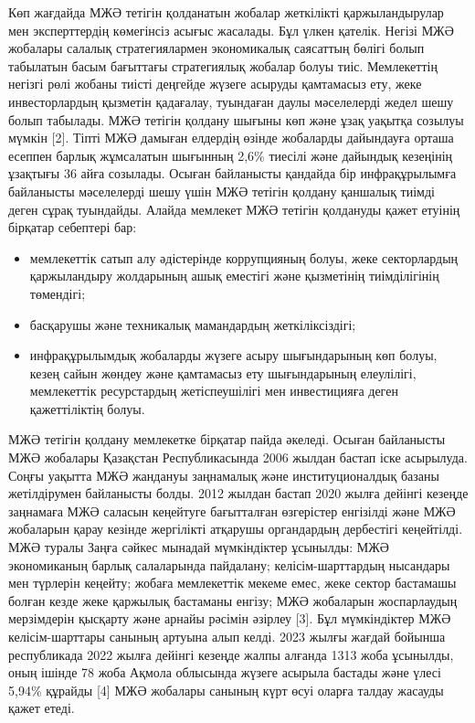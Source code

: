 Көп жағдайда МЖӘ тетігін қолданатын жобалар жеткілікті қаржыландырулар
мен эксперттердің көмегінсіз асығыс жасалады. Бұл үлкен қателік. Негізі
МЖӘ жобалары салалық стратегиялармен экономикалық саясаттың бөлігі болып
табылатын басым бағыттағы стратегиялық жобалар болуы тиіс. Мемлекеттің
негізгі рөлі жобаны тиісті деңгейде жүзеге асыруды қамтамасыз ету, жеке
инвесторлардың қызметін қадағалау, туындаған даулы мәселелерді жедел
шешу болып табылады. МЖӘ тетігін қолдану шығыны көп және ұзақ уақытқа
созылуы мүмкін {[}2{]}. Тіпті МЖӘ дамыған елдердің өзінде жобаларды
дайындауға орташа есеппен барлық жұмсалатын шығынның 2,6\% тиесілі және
дайындық кезеңінің ұзақтығы 36 айға созылады. Осыған байланысты қандайда
бір инфрақұрылымға байланысты мәселелерді шешу үшін МЖӘ тетігін қолдану
қаншалық тиімді деген сұрақ туындайды. Алайда мемлекет МЖӘ тетігін
қолдануды қажет етуінің бірқатар себептері бар:

\begin{itemize}
\item
  мемлекеттік сатып алу әдістерінде коррупцияның болуы, жеке
  секторлардың қаржыландыру жолдарының ашық еместігі және қызметінің
  тиімділігінің төмендігі;
\item
  басқарушы және техникалық мамандардың жеткіліксіздігі;
\item
  инфрақұрылымдық жобаларды жүзеге асыру шығындарының көп болуы, кезең
  сайын жөндеу және қамтамасыз ету шығындарының елеулілігі, мемлекеттік
  ресурстардың жетіспеушілігі мен инвестицияға деген қажеттіліктің
  болуы.
\end{itemize}

МЖӘ тетігін қолдану мемлекетке бірқатар пайда әкеледі. Осыған байланысты
МЖӘ жобалары Қазақстан Республикасында 2006 жылдан бастап іске
асырылуда. Соңғы уақытта МЖӘ жандануы заңнамалық және институционалдық
базаны жетілдірумен байланысты болды. 2012 жылдан бастап 2020 жылға
дейінгі кезеңде заңнамаға МЖӘ саласын кеңейтуге бағытталған өзгерістер
енгізілді және МЖӘ жобаларын қарау кезінде жергілікті атқарушы
органдардың дербестігі кеңейтілді. МЖӘ туралы Заңға сәйкес мынадай
мүмкіндіктер ұсынылды: МЖӘ экономиканың барлық салаларында пайдалану;
келісім-шарттардың нысандары мен түрлерін кеңейту; жобаға мемлекеттік
мекеме емес, жеке сектор бастамашы болған кезде жеке қаржылық бастаманы
енгізу; МЖӘ жобаларын жоспарлаудың мерзімдерін қысқарту және арнайы
рәсімін әзірлеу {[}3{]}. Бұл мүмкіндіктер МЖӘ келісім-шарттары санының
артуына алып келді. 2023 жылғы жағдай бойынша республикада 2022 жылға
дейінгі кезеңде жалпы алғанда 1313 жоба ұсынылды, оның ішінде 78 жоба
Ақмола облысында жүзеге асырыла бастады және үлесі 5,94\% құрайды
{[}4{]} МЖӘ жобалары санының күрт өсуі оларға талдау жасауды қажет
етеді.

